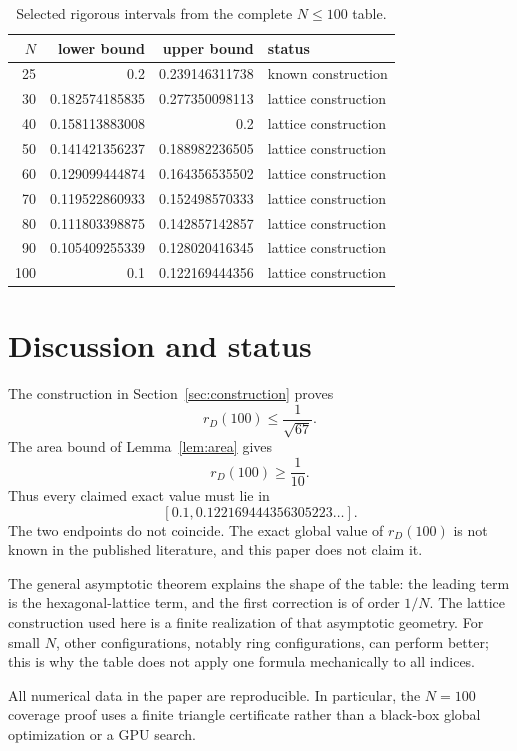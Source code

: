 \documentclass[11pt]{article}
\theoremstyle{definition}
\begin{document}
\begin{table}[ht]
\centering
\caption{Selected rigorous intervals from the complete $N\le100$ table.}
\label{tab:selected}
\begin{tabular}{@{}r r r l@{}}
\toprule
$N$&lower bound&upper bound&status\\
\midrule
25&0.2&0.239146311738&known construction\\
30&0.182574185835&0.277350098113&lattice construction\\
40&0.158113883008&0.2&lattice construction\\
50&0.141421356237&0.188982236505&lattice construction\\
60&0.129099444874&0.164356535502&lattice construction\\
70&0.119522860933&0.152498570333&lattice construction\\
80&0.111803398875&0.142857142857&lattice construction\\
90&0.105409255339&0.128020416345&lattice construction\\
100&0.1&0.122169444356&lattice construction\\
\bottomrule
\end{tabular}
\end{table}

\section{Discussion and status}
\label{sec:discussion}

The construction in Section~\ref{sec:construction} proves
\[
  r_D(100)\le \frac1{\sqrt{67}}.
\]
The area bound of Lemma~\ref{lem:area} gives
\[
  r_D(100)\ge \frac1{10}.
\]
Thus every claimed exact value must lie in
\[
  [0.1,0.122169444356305223\ldots].
\]
The two endpoints do not coincide.  The exact global value of
$r_D(100)$ is not known in the published literature, and this paper
does not claim it.

The general asymptotic theorem explains the shape of the table:
the leading term is the hexagonal-lattice term, and the first
correction is of order $1/N$.  The lattice construction used here is a
finite realization of that asymptotic geometry.  For small $N$, other
configurations, notably ring configurations, can perform better; this
is why the table does not apply one formula mechanically to all
indices.

All numerical data in the paper are reproducible.  In particular, the
$N=100$ coverage proof uses a finite triangle certificate rather than a
black-box global optimization or a GPU search.
\end{document}
